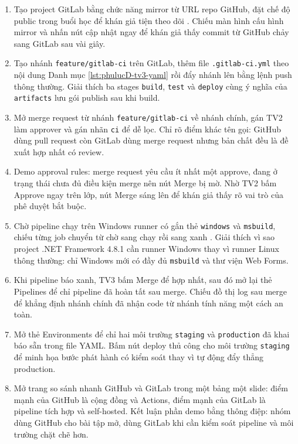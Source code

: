 \begin{enumerate}
\item Tạo project GitLab bằng chức năng mirror từ URL repo GitHub, đặt chế độ public trong buổi học để khán giả tiện theo dõi \cite{gitlabdocs}.
Chiếu màn hình cấu hình mirror và nhấn nút cập nhật ngay để khán giả thấy commit từ GitHub chảy sang GitLab sau vài giây.
\item Tạo nhánh \verb|feature/gitlab-ci| trên GitLab, thêm file \verb|.gitlab-ci.yml| theo nội dung Danh mục \ref{lst:phulucD-tv3-yaml} rồi đẩy nhánh lên bằng lệnh push thông thường.
Giải thích ba stages \verb|build|, \verb|test| và \verb|deploy| cùng ý nghĩa của \verb|artifacts| lưu gói publish sau khi build.
\item Mở merge request từ nhánh \verb|feature/gitlab-ci| về nhánh chính, gán TV2 làm approver và gán nhãn \verb|ci| để dễ lọc.
Chỉ rõ điểm khác tên gọi: GitHub dùng pull request còn GitLab dùng merge request nhưng bản chất đều là đề xuất hợp nhất có review.
\item Demo approval rules: merge request yêu cầu ít nhất một approve, đang ở trạng thái chưa đủ điều kiện merge nên nút Merge bị mờ.
Nhờ TV2 bấm Approve ngay trên lớp, nút Merge sáng lên để khán giả thấy rõ vai trò của phê duyệt bắt buộc.
\item Chờ pipeline chạy trên Windows runner có gắn thẻ \verb|windows| và \verb|msbuild|, chiếu từng job chuyển từ chờ sang chạy rồi sang xanh \cite{gitlabci,msmsbuild}.
Giải thích vì sao project .NET Framework 4.8.1 cần runner Windows thay vì runner Linux thông thường: chỉ Windows mới có đầy đủ \verb|msbuild| và thư viện Web Forms.
\item Khi pipeline báo xanh, TV3 bấm Merge để hợp nhất, sau đó mở lại thẻ Pipelines để chỉ pipeline đã hoàn tất sau merge.
Chiếu đồ thị log sau merge để khẳng định nhánh chính đã nhận code từ nhánh tính năng một cách an toàn.
\item Mở thẻ Environments để chỉ hai môi trường \verb|staging| và \verb|production| đã khai báo sẵn trong file YAML.
Bấm nút deploy thủ công cho môi trường \verb|staging| để minh họa bước phát hành có kiểm soát thay vì tự động đẩy thẳng production.
\item Mở trang so sánh nhanh GitHub và GitLab trong một bảng một slide: điểm mạnh của GitHub là cộng đồng và Actions, điểm mạnh của GitLab là pipeline tích hợp và self-hosted.
Kết luận phần demo bằng thông điệp: nhóm dùng GitHub cho bài tập mở, dùng GitLab khi cần kiểm soát pipeline và môi trường chặt chẽ hơn.
\end{enumerate}

